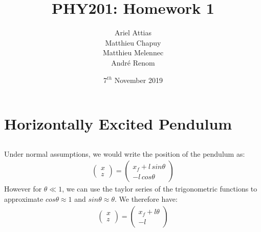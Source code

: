 \documentclass{article}
\title{PHY201: Homework 1}
\date{7$^{th}$ November 2019}
\author{Ariel Attias\\Matthieu Chapuy\\Matthieu Melennec\\Andr\'e Renom}
\begin{document}
	\maketitle
	\tableofcontents
	\newpage

\section{Horizontally Excited Pendulum}

\subsection{} %

Under normal assumptions, we would write the position of the pendulum as:
\begin{align*}
	\left( \begin{matrix} x \\ z \end{matrix} \right) = \left( \begin{matrix}x_f +  l\, sin\theta \\ -l\, cos\theta \end{matrix} \right)
\end{align*}
However for $\theta \ll 1$, we can use the taylor series of the trigonometric functions to approximate $cos\theta \approx 1$ and $sin\theta \approx \theta$. We therefore have:
\begin{align*}
	\left( \begin{matrix} x \\ z \end{matrix} \right) = \left( \begin{matrix}x_f +  l\theta \\ -l \end{matrix} \right)
\end{align*}
\subsection{} %



\subsection{} %



\subsection{} %
\end{document}
